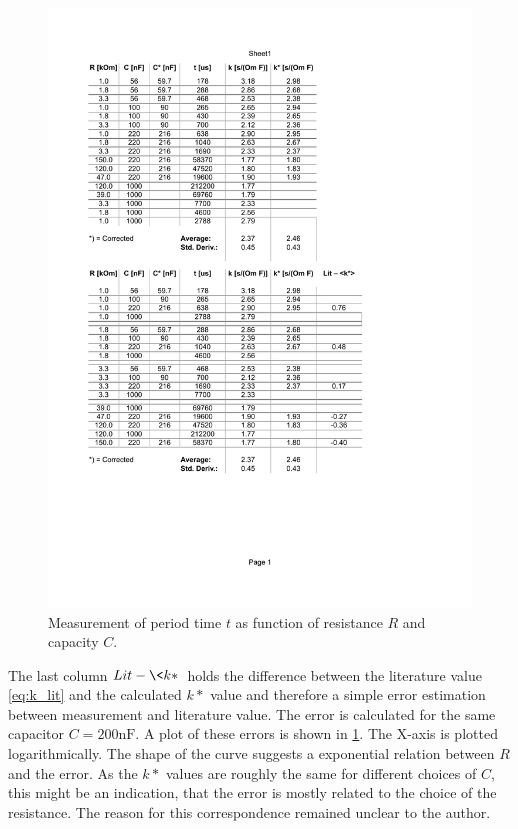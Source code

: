 \documentclass[journal]{IEEEtran}
\begin{document}
\begin{figure}
  \centering
   \includegraphics[trim=50mm 90mm 45mm 125mm, clip,
   width=\columnwidth,page=2]{results/am_data.pdf}
   \caption{Measurement of period time $t$ as function of resistance $R$ and
   capacity $C$.}
   \label{fig:am_plot}
\end{figure}

The last column $Lit - \<k*\>$ holds the difference between the literature value
\ref{eq:k_lit} and the calculated $k*$ value and therefore a simple error
estimation between measurement and literature value. The error is calculated for
the same capacitor $C = 200\text{nF}$. A plot of these errors is shown in 
\ref{fig:am_plot}. The X-axis is plotted logarithmically. The shape of the curve
suggests a exponential relation between $R$ and the error. As the $k*$ values
are roughly the same for different choices of $C$, this might be an indication,
that the error is mostly related to the choice of the resistance. The reason for
this correspondence remained unclear to the author.
\end{document}
